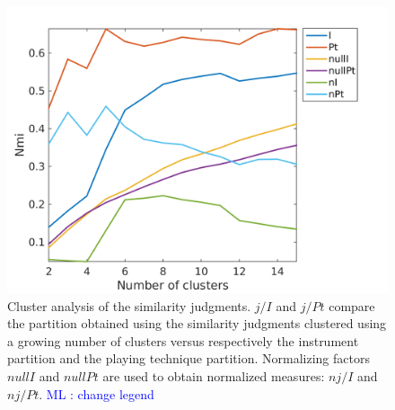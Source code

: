 \documentclass{article}
\newcommand{\ml}[1]{\textcolor{blue}{ML : #1}}
\begin{document}
\begin{figure}
\center
\includegraphics[width = \textwidth]{figures/clusterAnalysis.png}
\caption{Cluster analysis of the similarity judgments. $j/I$ and $j/Pt$ compare the partition obtained using the similarity judgments clustered using a growing number of clusters versus respectively the instrument partition and the playing technique partition. Normalizing factors $nullI$ and $nullPt$ are used to obtain normalized measures: $nj/I$ and $nj/Pt$. \ml{change legend}}
\label{fig:clusters}
\end{figure}
\end{document}
